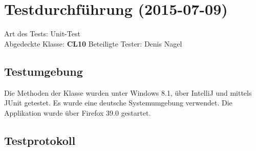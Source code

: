 
\chapter{Testdurchführung (2015-07-09)}

Art des Tests: Unit-Test\\
Abgedeckte Klasse: \textbf{CL10}
Beteiligte Tester: Denis Nagel\\

\section{Testumgebung}

Die Methoden der Klasse wurden unter Windows 8.1, über IntelliJ und mittels JUnit getestet. Es wurde eine deutsche Systemumgebung verwendet. Die Applikation wurde über Firefox 39.0 gestartet.

\section{Testprotokoll}

